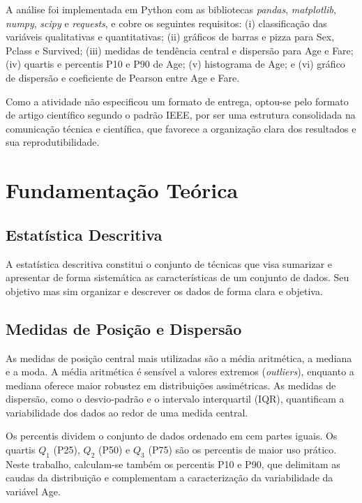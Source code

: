 \documentclass[conference]{IEEEtran}
\begin{document}
A análise foi implementada em Python com as bibliotecas \textit{pandas},
\textit{matplotlib}, \textit{numpy}, \textit{scipy} e \textit{requests},
e cobre os seguintes requisitos: (i) classificação das variáveis qualitativas
e quantitativas; (ii) gráficos de barras e pizza para Sex, Pclass e
Survived; (iii) medidas de tendência central e dispersão para Age e Fare;
(iv) quartis e percentis P10 e P90 de Age; (v) histograma de Age; e
(vi) gráfico de dispersão e coeficiente de Pearson entre Age e Fare.

Como a atividade não especificou um formato de entrega, optou-se pelo
formato de artigo científico segundo o padrão IEEE, por ser uma estrutura
consolidada na comunicação técnica e científica, que favorece a organização
clara dos resultados e sua reprodutibilidade.

\section{Fundamentação Teórica}

\subsection{Estatística Descritiva}

A estatística descritiva constitui o conjunto de técnicas que visa sumarizar
e apresentar de forma sistemática as características de um conjunto de dados.
Seu objetivo mas sim organizar e descrever os dados de forma clara e objetiva.

\subsection{Medidas de Posição e Dispersão}

As medidas de posição central mais utilizadas são a média aritmética,
a mediana e a moda. A média aritmética é sensível a valores extremos
(\textit{outliers}), enquanto a mediana oferece maior robustez em
distribuições assimétricas. As medidas de dispersão, como o desvio-padrão e
o intervalo interquartil (IQR), quantificam a variabilidade dos dados ao
redor de uma medida central.

Os percentis dividem o conjunto de dados ordenado em cem partes iguais.
Os quartis $Q_1$ (P25), $Q_2$ (P50) e $Q_3$ (P75) são os percentis de maior
uso prático. Neste trabalho, calculam-se também os percentis P10 e P90,
que delimitam as caudas da distribuição e complementam a caracterização
da variabilidade da variável Age.
\end{document}
